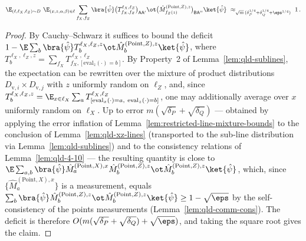 \begin{lemma}
	\label{lem:claim-17-3}
	\notready
	\[
		\E_{(\ell,\ell_X,\ell_Z) \sim D}\
		\E_{(x,z,\alpha,\beta) \in \ell}
		\sum_{f_X,f_Z} \bra{\hat\psi}
		\big(T^{\ell_X,\ell_Z}_{f_X,f_Z}\big)_{\mathsf{A}\mathsf{A}'} \ot
		\big(\hat{M}^{(\mathrm{Point},Z),z}_{f_Z(z)}
		\big)_{\mathsf{B}\mathsf{A}''}
		\ket{\hat\psi}
		\ \approx_{\sqrt{m}\,(\delta_P^{1/4} + \delta_Q^{1/4} +
			\eps^{1/4})}\ 1\,.
	\]
\end{lemma}
\begin{proof}
	By Cauchy--Schwarz it suffices to bound the deficit
	$1 - \E \sum_b \bra{\hat\psi} T^{\ell_X,\ell_Z,z}_{b} \ot
	\hat{M}^{(\mathrm{Point},Z),z}_{b} \ket{\hat\psi}$,
	where
	$T^{\ell_X,\ell_Z,z}_{b}
	= \sum_{f_X} T^{\ell_X,\ell_Z}_{f_X,[\mathrm{eval}_z(\cdot)=b]}$.
	By Property~2 of Lemma~\ref{lem:qld-sublines}, the expectation can be
	rewritten over the mixture of product distributions
	$D_{\mathrm{v},i} \times D_{\mathrm{v},j}$ with $z$ uniformly random on
	$\ell_Z$, and, since
	$T^{\ell_X,\ell_Z,z}_{b}
	= \E_{x \in \ell_X} \sum_a
	T^{\ell_X,\ell_Z}
	_{[\mathrm{eval}_x(\cdot)=a,\ \mathrm{eval}_z(\cdot)=b]}$,
	one may additionally average over $x$ uniformly random on $\ell_X$. Up
	to error $m(\sqrt{\delta_P} + \sqrt{\delta_Q})$ --- obtained by
	applying the error inflation of
	Lemma~\ref{lem:restricted-line-mixture-bounds} to the conclusion of
	Lemma~\ref{lem:qld-xz-lines} (transported to the sub-line distribution
	via Lemma~\ref{lem:qld-sublines}) and to the consistency relations of
	Lemma~\ref{lem:qld-4-10} --- the resulting quantity is close to
	$\E \sum_{a,b} \bra{\hat\psi}
	\hat{M}^{(\mathrm{Point},X),x}_{a}
	\hat{M}^{(\mathrm{Point},Z),z}_{b} \ot
	\hat{M}^{(\mathrm{Point},Z),z}_{b} \ket{\hat\psi}$,
	which, since $\{\hat{M}^{(\mathrm{Point},X),x}_{a}\}$ is a measurement,
	equals
	$\sum_b \bra{\hat\psi} \hat{M}^{(\mathrm{Point},Z),z}_{b} \ot
	\hat{M}^{(\mathrm{Point},Z),z}_{b} \ket{\hat\psi}
	\ge 1 - \sqrt{\eps}$
	by the self-consistency of the points measurements
	(Lemma~\ref{lem:qld-comm-cons}). The deficit is therefore
	$O(m(\sqrt{\delta_P} + \sqrt{\delta_Q}) + \sqrt{\eps})$, and taking the
	square root gives the claim.
\end{proof}

